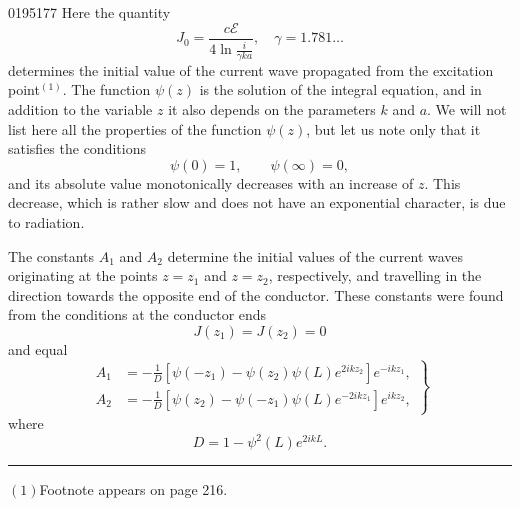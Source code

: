 \begin{scanpage}{0195}{177}
Here the quantity
\[
J_0=\frac{c\mathcal E}{4\ln\frac{i}{\gamma ka}},\quad\gamma=1.781\ldots\tag{28.04}
\]
determines the initial value of the current wave propagated from the excitation point$^{(1)}$. The function $\psi(z)$ is the solution of the integral equation, and in addition to the variable $z$ it also depends on the parameters $k$ and $a$. We will not list here all the properties of the function $\psi(z)$, but let us note only that it satisfies the conditions
\[
\psi(0)=1,\qquad\psi(\infty)=0,\tag{28.05}
\]
and its absolute value monotonically decreases with an increase of $z$. This decrease, which is rather slow and does not have an exponential character, is due to radiation.

The constants $A_1$ and $A_2$ determine the initial values of the current waves originating at the points $z=z_1$ and $z=z_2$, respectively, and travelling in the direction towards the opposite end of the conductor. These constants were found from the conditions at the conductor ends
\[
J(z_1)=J(z_2)=0\tag{28.06}
\]
and equal
\[
\left.\begin{aligned}A_1&=-\frac1D[\psi(-z_1)-\psi(z_2)\psi(L)e^{2ikz_2}]e^{-ikz_1},\\
A_2&=-\frac1D[\psi(z_2)-\psi(-z_1)\psi(L)e^{-2ikz_1}]e^{ikz_2},
\end{aligned}\right\}\tag{28.07}
\]
where
\[
D=1-\psi^2(L)e^{2ikL}.\tag{28.08}
\]
\par\bigskip\hrule\smallskip
$(1)$Footnote appears on page 216.
\end{scanpage}

